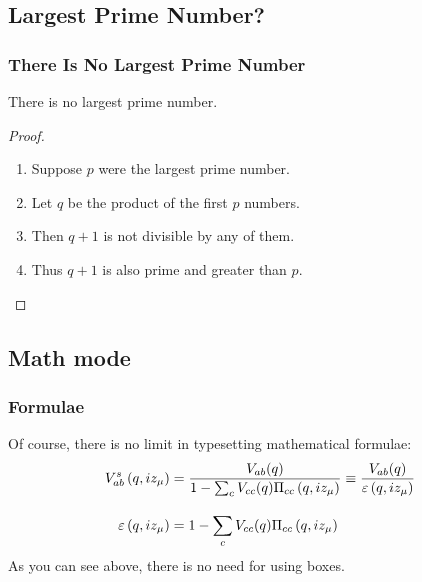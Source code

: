 \documentclass[aspectratio=169]{beamer}
\begin{document}
\subsection{Largest Prime Number?}
\begin{frame}[mpidrbackground=2]

  \frametitle{There Is No Largest Prime Number}
  \begin{theorem}
		There is no largest prime number.
  \end{theorem}
  \begin{proof}
    \begin{enumerate}
    \item<1-| alert@1> Suppose $p$ were the largest prime number.
    \item<2-> Let $q$ be the product of the first $p$ numbers.
    \item<3-> Then $q+1$ is not divisible by any of them.
    \item<1-> Thus $q+1$ is also prime and greater than $p$.\qedhere
    \end{enumerate}
  \end{proof}
\end{frame}


\subsection{Math mode}
\begin{frame}[mpidrbackground=2]
    \frametitle{Formulae}
	Of course, there is no limit in typesetting mathematical formulae:
	\begin{align}
		V_{ab}^s\left(q, i z_\mu\right)
			&= \frac{V_{ab}(q)}{1-\sum_{c}V_{cc}(q)\Pi_{cc}\left(q, i z_\mu\right)} 
				\equiv \frac{V_{ab}(q)}{\varepsilon\left(q, i z_\mu\right)}  \\
		\rule{0pt}{2em}\varepsilon\left(q, iz_\mu\right) 
			&= 1-\sum_c V_{cc}(q)\Pi_{cc}\left(q, i z_\mu\right)
	\end{align}
	As you can see above, there is no need for using boxes.
\end{frame}


\end{document}
